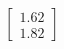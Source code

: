 \documentclass[preview]{standalone}
\begin{document}
\begin{align*}
\begin{bmatrix} 1.62 \\ 1.82 \end{bmatrix}
\end{align*}
\end{document}
